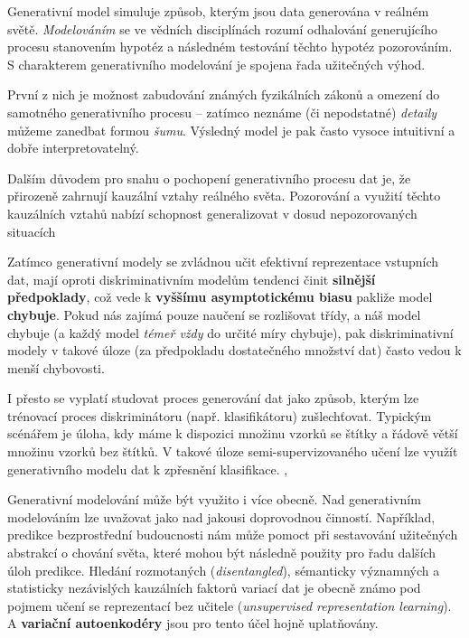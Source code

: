 Generativní model simuluje způsob, kterým jsou data generována v reálném světě.
\emph{Modelováním} se ve vědních disciplínách rozumí odhalování generujícího procesu stanovením hypotéz a následném testování těchto hypotéz pozorováním. 
S charakterem generativního modelování je spojena řada užitečných výhod. \cite{Goodfellow2016}

První z nich je možnost zabudování známých fyzikálních zákonů a omezení do samotného generativního procesu – 
zatímco neznáme (či nepodstatné) \emph{detaily} můžeme zanedbat formou \emph{šumu}. 
Výsledný model je pak často vysoce intuitivní a dobře interpretovatelný. \cite{Goodfellow2016}

Dalším důvodem pro snahu o pochopení generativního procesu dat je, že přirozeně zahrnují kauzální vztahy reálného světa.
Pozorování a využití těchto kauzálních vztahů nabízí schopnost generalizovat v dosud nepozorovaných situacích  \cite{Goodfellow2016}

Zatímco generativní modely se zvládnou učit efektivní reprezentace vstupních dat, mají oproti diskriminativním modelům tendenci činit \textbf{silnější předpoklady}, což vede k \textbf{vyššímu asymptotickému biasu} pakliže model \textbf{chybuje}. \cite{Banerjee2007}
Pokud nás zajímá pouze naučení se rozlišovat třídy, a náš model chybuje (a každý model \emph{témeř vždy} do určité míry chybuje), pak diskriminativní modely v takové úloze (za předpokladu dostatečného množství dat) často vedou k menší chybovosti.  \cite{Goodfellow2016}

I přesto se vyplatí studovat proces generování dat jako způsob, kterým lze trénovací proces diskriminátoru (např. klasifikátoru) zušlechťovat.
Typickým scénářem je úloha, kdy máme k dispozici množinu vzorků se štítky a řádově větší množinu vzorků bez štítků.
V takové úloze semi-supervizovaného učení lze využít generativního modelu dat k zpřesnění klasifikace. \cite{Kingma2014}, \cite{Soenderby2016}

Generativní modelování může být využito i více obecně. Nad generativním modelováním lze uvažovat jako nad jakousi doprovodnou činností.
Například, predikce bezprostřední budoucnosti nám může pomoct při sestavování užitečných abstrakcí o chování světa, které mohou být následně použity pro řadu dalších úloh predikce.
Hledání rozmotaných (\emph{disentangled}), sémanticky významných a statisticky nezávislých kauzálních faktorů variací dat je obecně známo pod pojmem učení se reprezentací bez učitele (\emph{unsupervised representation learning}).
A \textbf{variační autoenkodéry} jsou pro tento účel hojně uplatňovány. \cite{Goodfellow2016}

